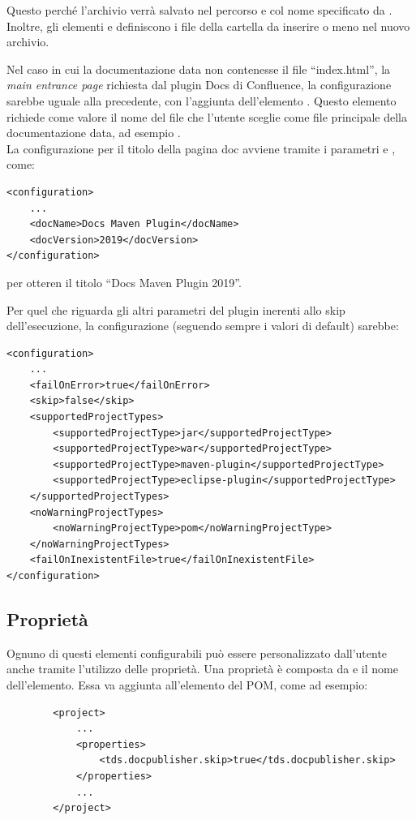Questo perché l'archivio verrà salvato nel percorso e col nome specificato da .
Inoltre, gli elementi  e  definiscono i file della cartella da inserire o meno nel nuovo archivio.

Nel caso in cui la documentazione data non contenesse il file ``index.html'', la \emph{main entrance page} richiesta dal plugin Docs di Confluence, la configurazione sarebbe uguale alla precedente, con l'aggiunta dell'elemento .
Questo elemento richiede come valore il nome del file che l'utente sceglie come file principale della documentazione data, ad esempio .\\


La configurazione per il titolo della pagina doc avviene tramite i parametri  e , come:
\begin{lstlisting}
<configuration>
    ...
    <docName>Docs Maven Plugin</docName>
    <docVersion>2019</docVersion>
</configuration>
\end{lstlisting}
per otteren il titolo ``Docs Maven Plugin 2019''.

Per quel che riguarda gli altri parametri del plugin inerenti allo skip dell'esecuzione, la configurazione (seguendo sempre i valori di default) sarebbe:

\begin{lstlisting}
<configuration>
    ...
    <failOnError>true</failOnError>
    <skip>false</skip>
    <supportedProjectTypes>
        <supportedProjectType>jar</supportedProjectType>
        <supportedProjectType>war</supportedProjectType>
        <supportedProjectType>maven-plugin</supportedProjectType>
        <supportedProjectType>eclipse-plugin</supportedProjectType>
    </supportedProjectTypes>
    <noWarningProjectTypes> 
        <noWarningProjectType>pom</noWarningProjectType>
    </noWarningProjectTypes>
    <failOnInexistentFile>true</failOnInexistentFile>
</configuration>
\end{lstlisting}

    \subsection{Proprietà}
    Ognuno di questi elementi configurabili può essere personalizzato dall'utente anche tramite l'utilizzo delle proprietà.
    Una proprietà è composta da  e il nome dell'elemento. Essa va aggiunta all'elemento  del POM, come ad esempio:
        \begin{lstlisting}
        <project>
            ...
            <properties>
                <tds.docpublisher.skip>true</tds.docpublisher.skip>
            </properties>
            ...    
        </project>
        \end{lstlisting}

